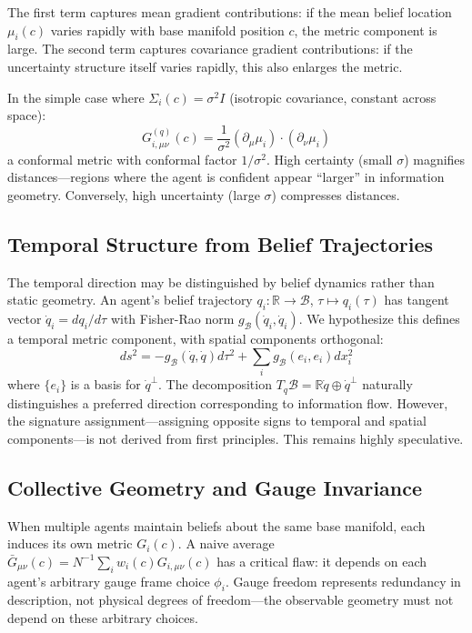 \documentclass[11pt]{article}
\begin{document}
The first term captures mean gradient contributions: if the mean belief location $\mu_i(c)$ varies rapidly with base manifold position $c$, the metric component is large. The second term captures covariance gradient contributions: if the uncertainty structure itself varies rapidly, this also enlarges the metric.

In the simple case where $\Sigma_i(c) = \sigma^2 I$ (isotropic covariance, constant across space):
\begin{equation}
G^{(q)}_{i,\mu\nu}(c) = \frac{1}{\sigma^2}(\partial_\mu\mu_i)\cdot(\partial_\nu\mu_i)
\end{equation}
a conformal metric with conformal factor $1/\sigma^2$. High certainty (small $\sigma$) magnifies distances---regions where the agent is confident appear ``larger'' in information geometry. Conversely, high uncertainty (large $\sigma$) compresses distances.

\subsection{Temporal Structure from Belief Trajectories}

The temporal direction may be distinguished by belief dynamics rather than static geometry. An agent's belief trajectory $q_i: \mathbb{R} \to \mathcal{B}$, $\tau \mapsto q_i(\tau)$ has tangent vector $\dot{q}_i = dq_i/d\tau$ with Fisher-Rao norm $g_{\mathcal{B}}(\dot{q}_i, \dot{q}_i)$. We hypothesize this defines a temporal metric component, with spatial components orthogonal:
\begin{equation}
ds^2 = -g_{\mathcal{B}}(\dot{q}, \dot{q}) d\tau^2 + \sum_i g_{\mathcal{B}}(e_i, e_i) dx_i^2
\end{equation}
where $\{e_i\}$ is a basis for $\dot{q}^\perp$. The decomposition $T_q\mathcal{B} = \mathbb{R}\dot{q} \oplus \dot{q}^\perp$ naturally distinguishes a preferred direction corresponding to information flow. However, the signature assignment---assigning opposite signs to temporal and spatial components---is not derived from first principles. This remains highly speculative.

\subsection{Collective Geometry and Gauge Invariance}

When multiple agents maintain beliefs about the same base manifold, each induces its own metric $G_i(c)$. A naive average $\bar{G}_{\mu\nu}(c) = N^{-1}\sum_i w_i(c) G_{i,\mu\nu}(c)$ has a critical flaw: it depends on each agent's arbitrary gauge frame choice $\phi_i$. Gauge freedom represents redundancy in description, not physical degrees of freedom---the observable geometry must not depend on these arbitrary choices.
\end{document}
